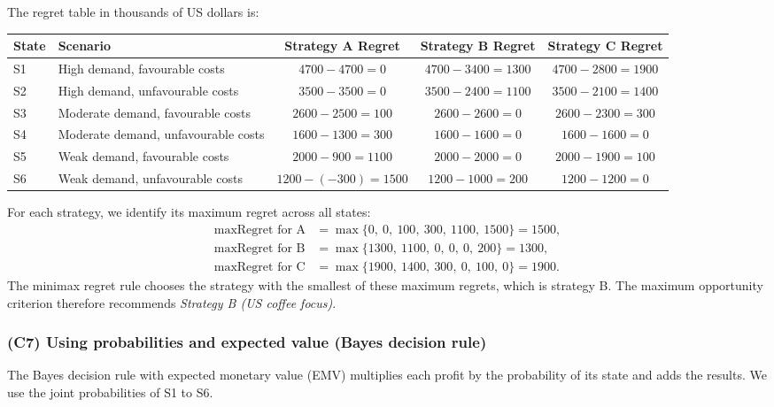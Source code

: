 \documentclass[11pt]{article}
\begin{document}
	The regret table in thousands of US dollars is:
	\begin{table}[h!]
		\centering
		\begin{tabularx}{\linewidth}{@{}lYccc@{}}
			\toprule
			State & Scenario & Strategy A Regret & Strategy B Regret & Strategy C Regret \\
			\midrule
			S1 & High demand, favourable costs &
			\(4700-4700=0\) & \(4700-3400=1300\) & \(4700-2800=1900\) \\
			S2 & High demand, unfavourable costs &
			\(3500-3500=0\) & \(3500-2400=1100\) & \(3500-2100=1400\) \\
			S3 & Moderate demand, favourable costs &
			\(2600-2500=100\) & \(2600-2600=0\) & \(2600-2300=300\) \\
			S4 & Moderate demand, unfavourable costs &
			\(1600-1300=300\) & \(1600-1600=0\) & \(1600-1600=0\) \\
			S5 & Weak demand, favourable costs &
			\(2000-900=1100\) & \(2000-2000=0\) & \(2000-1900=100\) \\
			S6 & Weak demand, unfavourable costs &
			\(1200-(-300)=1500\) & \(1200-1000=200\) & \(1200-1200=0\) \\
			\bottomrule
		\end{tabularx}
	\end{table}
	
	For each strategy, we identify its maximum regret across all states:
	\[
	\begin{aligned}
		\max \text{Regret for A} &= \max\{0,\ 0,\ 100,\ 300,\ 1100,\ 1500\}=1500,\\
		\max \text{Regret for B} &= \max\{1300,\ 1100,\ 0,\ 0,\ 0,\ 200\}=1300,\\
		\max \text{Regret for C} &= \max\{1900,\ 1400,\ 300,\ 0,\ 100,\ 0\}=1900.
	\end{aligned}
	\]
	The minimax regret rule chooses the strategy with the smallest of these maximum regrets, which is strategy B. The maximum opportunity criterion therefore recommends \emph{Strategy B (US coffee focus)}.
	
	\subsubsection{(C7) Using probabilities and expected value (Bayes decision rule)}\label{subsubsec:example2-c7}
	
	The Bayes decision rule with expected monetary value (EMV) multiplies each profit by the probability of its state and adds the results. We use the joint probabilities of S1 to S6.
	
\end{document}
